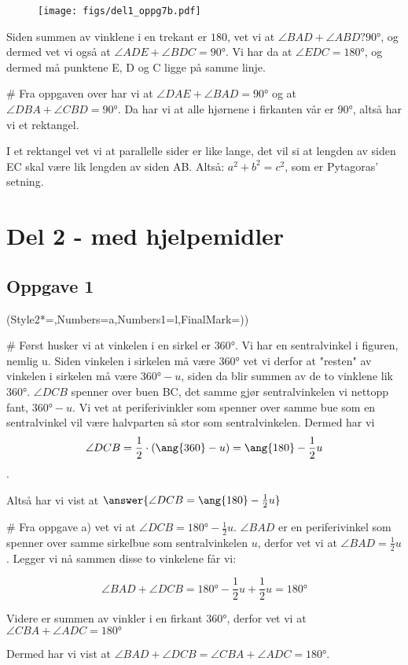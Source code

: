 \begin{easylist}[enumerate]
	\begin{figure}[htbp]
		\centering
		\texttt{[image: figs/del1\_oppg7b.pdf]}
		\label{fig:del1_oppg7b}
	\end{figure}
	
	Siden summen av vinklene i en trekant er $180$, vet vi at $\angle BAD + \angle  ABD ? \ang{90}$, og dermed vet vi også at $\angle ADE + \angle BDC = \ang{90}$. Vi har da at $\angle EDC  = \ang{180}$, og dermed må punktene E, D og C ligge på samme linje.
	
	# Fra oppgaven over har vi at $\angle DAE + \angle BAD = \ang{90}$ og at $\angle DBA + \angle CBD = \ang{90}$. Da har vi at alle hjørnene i firkanten vår er $\ang{90}$, altså har vi et rektangel. 
	
	I et rektangel vet vi at parallelle sider er like lange, det vil si at lengden av siden EC skal være lik lengden av siden AB. Altså: $a^2 + b^2 = c^2$, som er Pytagoras' setning.
	
\end{easylist}
\newpage


\section*{Del 2 - med hjelpemidler}

\subsection*{Oppgave 1}
\begin{easylist}[enumerate]
	\ListProperties(Style2*=,Numbers=a,Numbers1=l,FinalMark={)})
	
	# Først husker vi at vinkelen i en sirkel er $\ang{360}$. Vi har en sentralvinkel i figuren, nemlig u. Siden vinkelen i sirkelen må være $\ang{360}$ vet vi derfor at "resten" av vinkelen i sirkelen må være $\ang{360} - u$, siden da blir summen av de to vinklene lik $\ang{360}$. $\angle DCB$ spenner over buen BC, det samme gjør sentralvinkelen vi nettopp fant, $\ang{360} - u$. Vi vet at periferivinkler som spenner over samme bue som en sentralvinkel vil være halvparten så stor som sentralvinkelen. Dermed har vi $$\angle DCB = \frac{1}{2} \cdot (\ang{360} - u) \\ = \ang{180} - \frac{1}{2}u$$.
	
	Altså har vi vist at $\answer{\angle DCB = \ang{180} - \frac{1}{2}u}$
	
	# Fra oppgave a) vet vi at $\angle DCB = \ang{180} - \frac{1}{2}u$. $\angle BAD$ er en periferivinkel som spenner over samme sirkelbue som sentralvinkelen $u$, derfor vet vi at  $\angle BAD = \frac{1}{2}u$. Legger vi nå sammen disse to vinkelene får vi:
	
	$$\angle BAD + \angle DCB = \ang{180} - \frac{1}{2}u + \frac{1}{2}u = \ang{180}$$
	
	Videre er summen av vinkler i en firkant $\ang{360}$, derfor vet vi at $\angle CBA + \angle ADC = \ang{180}$
	
	Dermed har vi vist at $\angle BAD + \angle DCB = \angle CBA + \angle ADC = \ang{180}$.
	
	
\end{easylist}
